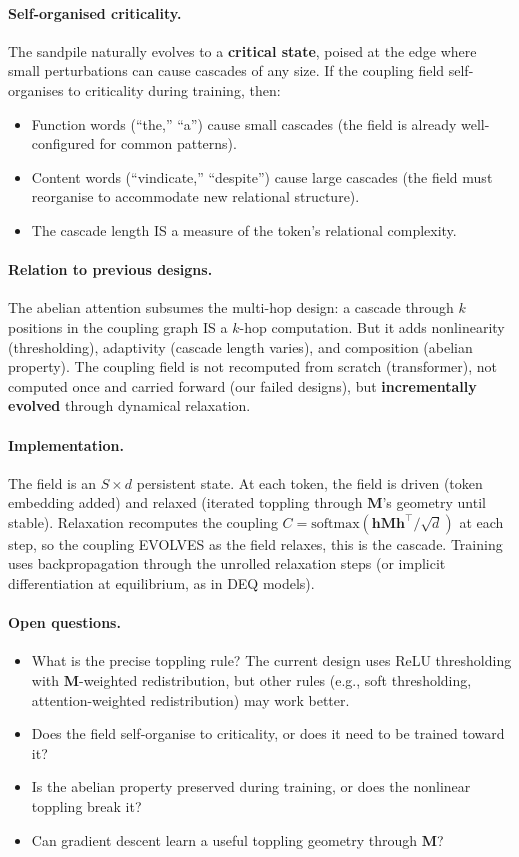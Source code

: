 \documentclass[11pt, a4paper]{article}
\newcommand{\M}{\mathbf{M}}
\newcommand{\h}{\mathbf{h}}
\theoremstyle{plain}
\theoremstyle{definition}
\theoremstyle{remark}
\begin{document}
\paragraph{Self-organised criticality.}
The sandpile naturally evolves to a \textbf{critical state}, poised at the edge where small perturbations can cause cascades of any size.
If the coupling field self-organises to criticality during training, then:
\begin{itemize}[nosep]
\item Function words (``the,'' ``a'') cause small cascades (the field is already well-configured for common patterns).
\item Content words (``vindicate,'' ``despite'') cause large cascades (the field must reorganise to accommodate new relational structure).
\item The cascade length IS a measure of the token's relational complexity.
\end{itemize}

\paragraph{Relation to previous designs.}
The abelian attention subsumes the multi-hop design: a cascade through $k$ positions in the coupling graph IS a $k$-hop computation.
But it adds nonlinearity (thresholding), adaptivity (cascade length varies), and composition (abelian property).
The coupling field is not recomputed from scratch (transformer), not computed once and carried forward (our failed designs), but \textbf{incrementally evolved} through dynamical relaxation.

\paragraph{Implementation.}
The field is an $S \times d$ persistent state.
At each token, the field is driven (token embedding added) and relaxed (iterated toppling through $\M$'s geometry until stable).
Relaxation recomputes the coupling $C = \mathrm{softmax}(\h \M \h^\top / \sqrt{d})$ at each step, so the coupling EVOLVES as the field relaxes, this is the cascade.
Training uses backpropagation through the unrolled relaxation steps (or implicit differentiation at equilibrium, as in DEQ models).

\paragraph{Open questions.}
\begin{itemize}[nosep]
\item What is the precise toppling rule? The current design uses ReLU thresholding with $\M$-weighted redistribution, but other rules (e.g., soft thresholding, attention-weighted redistribution) may work better.
\item Does the field self-organise to criticality, or does it need to be trained toward it?
\item Is the abelian property preserved during training, or does the nonlinear toppling break it?
\item Can gradient descent learn a useful toppling geometry through $\M$?
\end{itemize}
\end{document}
